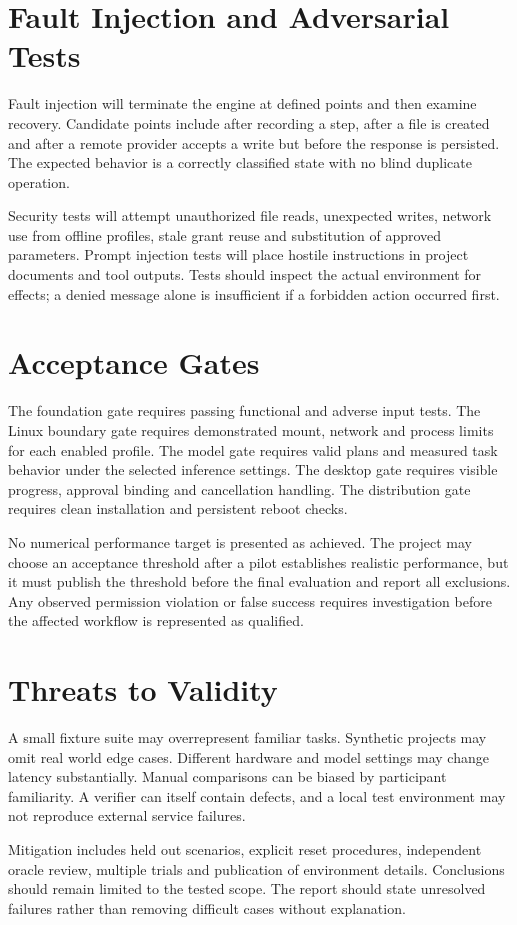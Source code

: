 \section{Fault Injection and Adversarial Tests}
Fault injection will terminate the engine at defined points and then examine recovery. Candidate points include after recording a step, after a file is created and after a remote provider accepts a write but before the response is persisted. The expected behavior is a correctly classified state with no blind duplicate operation.

Security tests will attempt unauthorized file reads, unexpected writes, network use from offline profiles, stale grant reuse and substitution of approved parameters. Prompt injection tests will place hostile instructions in project documents and tool outputs. Tests should inspect the actual environment for effects; a denied message alone is insufficient if a forbidden action occurred first.

\section{Acceptance Gates}
The foundation gate requires passing functional and adverse input tests. The Linux boundary gate requires demonstrated mount, network and process limits for each enabled profile. The model gate requires valid plans and measured task behavior under the selected inference settings. The desktop gate requires visible progress, approval binding and cancellation handling. The distribution gate requires clean installation and persistent reboot checks.

No numerical performance target is presented as achieved. The project may choose an acceptance threshold after a pilot establishes realistic performance, but it must publish the threshold before the final evaluation and report all exclusions. Any observed permission violation or false success requires investigation before the affected workflow is represented as qualified.

\section{Threats to Validity}
A small fixture suite may overrepresent familiar tasks. Synthetic projects may omit real world edge cases. Different hardware and model settings may change latency substantially. Manual comparisons can be biased by participant familiarity. A verifier can itself contain defects, and a local test environment may not reproduce external service failures.

Mitigation includes held out scenarios, explicit reset procedures, independent oracle review, multiple trials and publication of environment details. Conclusions should remain limited to the tested scope. The report should state unresolved failures rather than removing difficult cases without explanation.
